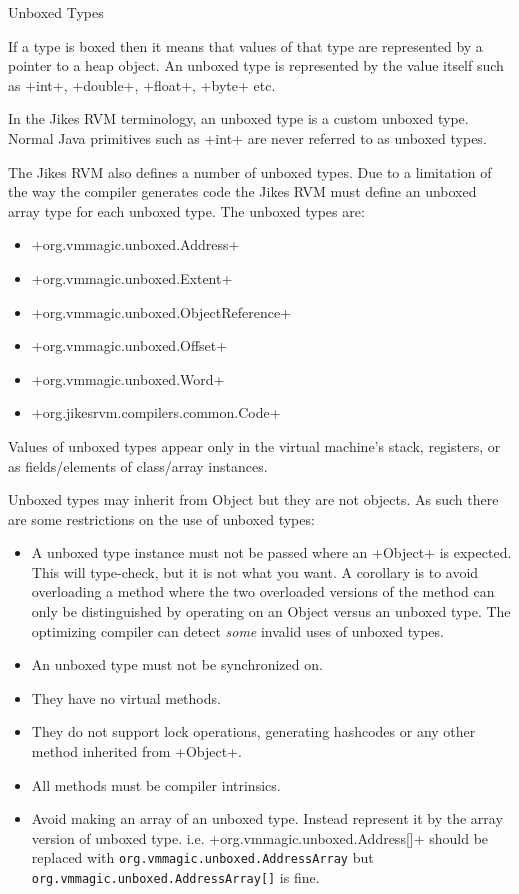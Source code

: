 \begin{section}{Unboxed Types}
\label{sec:unboxedtypes}

If a type is boxed then it means that values of that type are represented by a pointer to a heap object. An unboxed type is represented by the value itself such as \spverb+int+, \spverb+double+, \spverb+float+, \spverb+byte+ etc.

In the Jikes RVM terminology, an unboxed type is a custom unboxed type. Normal Java primitives such as \spverb+int+ are never referred to as unboxed types.

The Jikes RVM also defines a number of unboxed types. Due to a limitation of the way the compiler generates code the Jikes RVM must define an unboxed array type for each unboxed type. The unboxed types are:
\begin{itemize}
  \item \spverb+org.vmmagic.unboxed.Address+
  \item \spverb+org.vmmagic.unboxed.Extent+
  \item \spverb+org.vmmagic.unboxed.ObjectReference+
  \item \spverb+org.vmmagic.unboxed.Offset+
  \item \spverb+org.vmmagic.unboxed.Word+
  \item \spverb+org.jikesrvm.compilers.common.Code+
\end{itemize}

Values of unboxed types appear only in the virtual machine's stack, registers, or as fields/elements of class/array instances.

Unboxed types may inherit from Object but they are not objects. As such there are some restrictions on the use of unboxed types:
\begin{itemize}
  \item A unboxed type instance must not be passed where an \spverb+Object+ is expected. This will type-check, but it is not what you want. A corollary is to avoid overloading a method where the two overloaded versions of the method can only be distinguished by operating on an Object versus an unboxed type. The optimizing compiler can detect \textit{some} invalid uses of unboxed types.
  \item An unboxed type must not be synchronized on.
  \item They have no virtual methods.
  \item They do not support lock operations, generating hashcodes or any other method inherited from \spverb+Object+.
  \item All methods must be compiler intrinsics.
  \item  Avoid making an array of an unboxed type. Instead represent it by the array version of unboxed type. i.e. \spverb+org.vmmagic.unboxed.Address[]+ should be replaced with \texttt{org.vm\-ma\-gic.un\-box\-ed.Address\-Ar\-ray} but \texttt{org.vm\-ma\-gic.un\-box\-ed.Address\-Ar\-ray[]} is fine.
\end{itemize}


\end{section}
